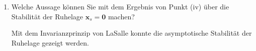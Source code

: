 \documentclass[crop=false]{standalone}
\begin{document}
\begin{taskbreak}
\begin{enumerate}[i]
\item Welche Aussage können Sie mit dem Ergebnis von Punkt (iv) über die Stabilität
der Ruhelage $\mathbf{x}_{s}=\mathbf{0}$ machen?
\begin{solution}
 Mit dem Invarianzprinzip von LaSalle konnte die asymptotische Stabilität der Ruhelage gezeigt werden. \end{solution}
\end{enumerate}
\end{taskbreak}
\end{document}
